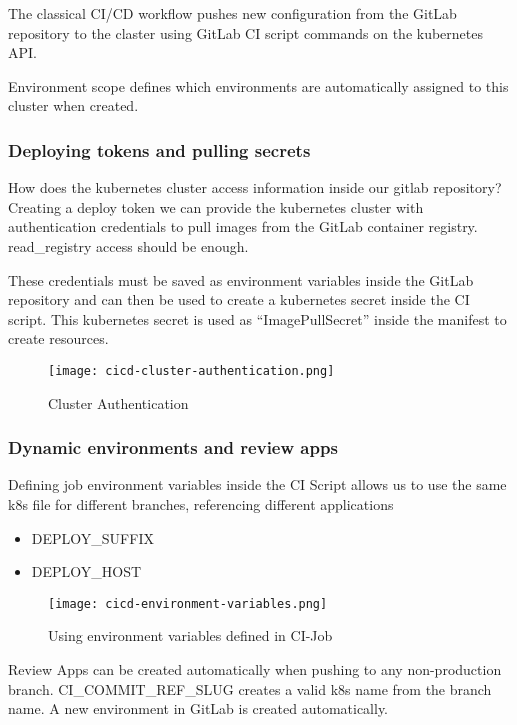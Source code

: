 The classical CI/CD workflow pushes new configuration from the GitLab repository to the claster using 
GitLab CI script commands on the kubernetes API.

Environment scope defines which environments are automatically assigned to this cluster when created.

\subsubsection{Deploying tokens and pulling secrets}
How does the kubernetes cluster access information inside our gitlab repository?
Creating a deploy token we can provide the kubernetes cluster with authentication credentials to pull images from the GitLab container registry.
read\_registry access should be enough.

These credentials must be saved as environment variables inside the 
GitLab repository and can then be used to create a kubernetes secret inside the CI script.
This kubernetes secret is used as ``ImagePullSecret'' inside the manifest to create resources.

\begin{figure}[h]
    \centering
    \texttt{[image: cicd-cluster-authentication.png]}
    \caption{Cluster Authentication}
\end{figure}

\subsubsection{Dynamic environments and review apps}

Defining job environment variables inside the CI Script allows us to use the same k8s file for different branches, referencing different applications
\begin{itemize}
    \item DEPLOY\_SUFFIX
    \item DEPLOY\_HOST
\end{itemize}

\begin{figure}[h]
    \centering
    \texttt{[image: cicd-environment-variables.png]}
    \caption{Using environment variables defined in CI-Job}
\end{figure}

Review Apps can be created automatically when pushing to any non-production branch. CI\_COMMIT\_REF\_SLUG creates a valid k8s name from the branch name. 
A new environment in GitLab is created automatically.

